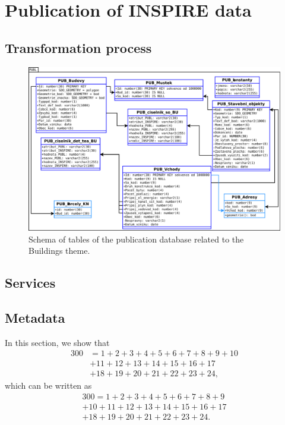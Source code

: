 \documentclass[eprint]{actapoly}
\begin{document}
\section{Publication of INSPIRE data}
\label{sec:publication}

\subsection{Transformation process}

\begin{figure}
\centering
\includegraphics[width=0.8\linewidth]{pics/BU_PUBL_DB.pdf} %
\caption{Schema of tables of the publication database related to the Buildings theme.}
\label{fig:publication_db}
\end{figure}

\subsection{Services}

\subsection{Metadata}

In this section, we show that
\begin{align}
	300 &= 1+2+3+4+5+6+7+8+9+10
\nonumber\\
	& +11+12+13+14+15+16+17
\nonumber\\
	& +18+19+20+21+22+23+24,
\end{align}
which can be written as
\begin{multline}
	300 = 1+2+3+4+5+6+7+8+9
\\
	+10+11+12+13+14+15+16+17
\\
	+18+19+20+21+22+23+24.
\end{multline}
\end{document}
